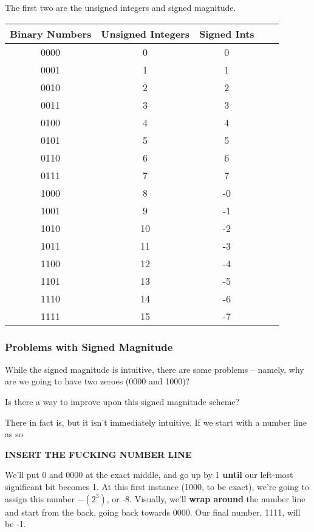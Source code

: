 \documentclass[12pt]{article}
\begin{document}
  The first two are the unsigned integers and signed magnitude. 
    \begin{center}
        \begin{tabular}{|c|c|c|c|c|}
          \hline
          Binary Numbers & Unsigned Integers & Signed Ints \\
          \hline
          0000 & 0 & 0\\ 
          0001 & 1 & 1\\  
          0010 & 2 & 2\\  
          0011 & 3 & 3\\  
          0100 & 4 & 4\\  
          0101 & 5 & 5\\  
          0110 & 6 & 6\\         
          0111 & 7 & 7\\  
          1000 & 8 & -0\\  
          1001 & 9 & -1\\  
          1010 & 10 & -2\\
          1011 & 11 & -3\\
          1100 & 12 & -4\\
          1101 & 13 & -5\\
          1110 & 14 & -6\\
          1111 & 15 & -7\\
          \hline
        \end{tabular}
    \end{center}

    \subsubsection*{Problems with Signed Magnitude}

    While the signed magnitude is intuitive, there are some problems -- namely,
    why are we going to have two zeroes (0000 and 1000)?

    Is there a way to improve upon this signed magnitude scheme?

    There in fact is, but it isn't immediately intuitive. If we start with a
    number line as so

    \textbf{INSERT THE FUCKING NUMBER LINE}

    We'll put 0 and 0000 at the exact middle, and go up by 1 \textbf{until} our
    left-most significant bit becomes 1. At this first instance (1000, to be exact),
    we're going to assign this number $-(2^3)$, or -8. Visually, we'll \textbf{wrap around}
    the number line and start from the back, going back towards 0000. Our final number, 1111,
    will be -1.
\end{document}

